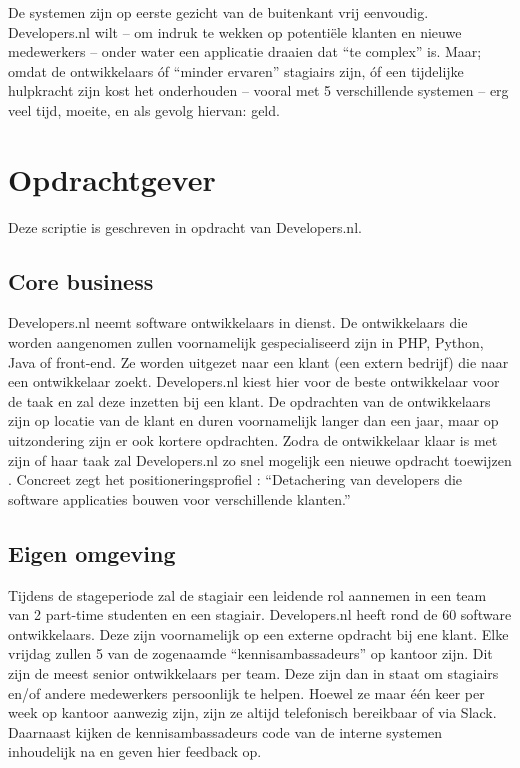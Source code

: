 De systemen zijn op eerste gezicht van de buitenkant vrij eenvoudig. Developers.nl wilt -- om indruk te wekken op potentiële klanten en nieuwe medewerkers -- onder water een applicatie draaien dat \enquote{te complex} is. Maar; omdat de ontwikkelaars óf \enquote{minder ervaren} stagiairs zijn, óf een tijdelijke hulpkracht zijn kost het onderhouden -- vooral met 5 verschillende systemen -- erg veel tijd, moeite, en als gevolg hiervan: geld. 

\section{Opdrachtgever}

Deze scriptie is geschreven in opdracht van Developers.nl.

\subsection{Core business}
Developers.nl neemt software ontwikkelaars in dienst. De ontwikkelaars die worden aangenomen zullen voornamelijk gespecialiseerd zijn in PHP, Python, Java of front-end. Ze worden uitgezet naar een klant (een extern bedrijf) die naar een ontwikkelaar zoekt. Developers.nl kiest hier voor de beste ontwikkelaar voor de taak en zal deze inzetten bij een klant. De opdrachten van de ontwikkelaars zijn op locatie van de klant en duren voornamelijk langer dan een jaar, maar op uitzondering zijn er ook kortere opdrachten. Zodra de ontwikkelaar klaar is met zijn of haar taak zal Developers.nl zo snel mogelijk een nieuwe opdracht toewijzen \parencite{Stageplan}. Concreet zegt het positioneringsprofiel \parencite{Positioneringsprofiel}: \enquote{Detachering van developers die software applicaties bouwen voor verschillende klanten.}

\subsection{Eigen omgeving}

Tijdens de stageperiode zal de stagiair een leidende rol aannemen in een team van 2 part-time studenten en een stagiair. Developers.nl heeft rond de 60 software ontwikkelaars. Deze zijn voornamelijk op een externe opdracht bij ene klant. Elke vrijdag zullen 5 van de zogenaamde \enquote{kennisambassadeurs} op kantoor zijn. Dit zijn de meest senior ontwikkelaars per team. Deze zijn dan in staat om stagiairs en/of andere medewerkers persoonlijk te helpen. Hoewel ze maar één keer per week op kantoor aanwezig zijn, zijn ze altijd telefonisch bereikbaar of via Slack. Daarnaast kijken de kennisambassadeurs code van de interne systemen inhoudelijk na en geven hier feedback op.

